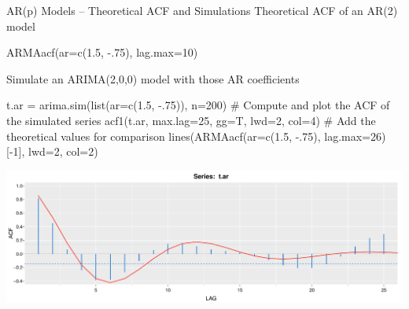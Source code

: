 \documentclass[ignorenonframetext,xcolor=x11names]{beamer}
\begin{document}

\begin{frame}[fragile]{AR(p) Models -- Theoretical ACF and Simulations}
Theoretical ACF of an AR(2) model
\begin{Rcode}
ARMAacf(ar=c(1.5, -.75), lag.max=10)
\end{Rcode}
Simulate an ARIMA(2,0,0) model with those AR coefficients
\begin{Rcode}
t.ar = arima.sim(list(ar=c(1.5, -.75)), n=200)
# Compute and plot the ACF of the simulated series
acf1(t.ar, max.lag=25, gg=T, lwd=2, col=4)
# Add the theoretical values for comparison
lines(ARMAacf(ar=c(1.5, -.75), lag.max=26)[-1], 
      lwd=2, col=2)
\end{Rcode}
\begin{center}
\includegraphics[width=.75\textwidth]{figure18.pdf}
\end{center}
\end{frame}

\end{document}
